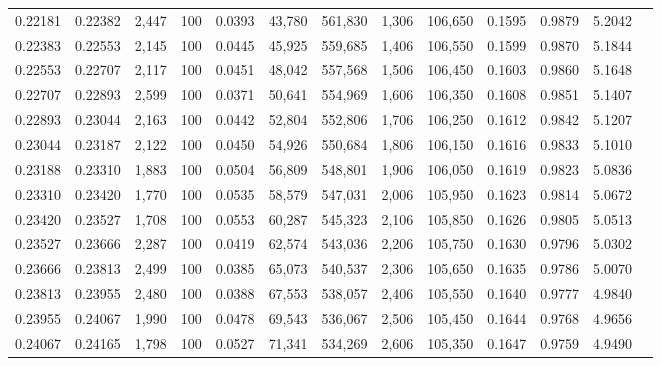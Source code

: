 \begin{tabular}{rrrrrrrrrrrrr}
0.22181 & 0.22382 & 2,447 & 100 &                                     0.0393 &  43,780 & 561,830 &   1,306 & 106,650 & 0.1595 & 0.9879 & 5.2042 \\
0.22383 & 0.22553 & 2,145 & 100 &                                     0.0445 &  45,925 & 559,685 &   1,406 & 106,550 & 0.1599 & 0.9870 & 5.1844 \\
0.22553 & 0.22707 & 2,117 & 100 &                                     0.0451 &  48,042 & 557,568 &   1,506 & 106,450 & 0.1603 & 0.9860 & 5.1648 \\
0.22707 & 0.22893 & 2,599 & 100 &                                     0.0371 &  50,641 & 554,969 &   1,606 & 106,350 & 0.1608 & 0.9851 & 5.1407 \\
0.22893 & 0.23044 & 2,163 & 100 &                                     0.0442 &  52,804 & 552,806 &   1,706 & 106,250 & 0.1612 & 0.9842 & 5.1207 \\
0.23044 & 0.23187 & 2,122 & 100 &                                     0.0450 &  54,926 & 550,684 &   1,806 & 106,150 & 0.1616 & 0.9833 & 5.1010 \\
0.23188 & 0.23310 & 1,883 & 100 &                                     0.0504 &  56,809 & 548,801 &   1,906 & 106,050 & 0.1619 & 0.9823 & 5.0836 \\
0.23310 & 0.23420 & 1,770 & 100 &                                     0.0535 &  58,579 & 547,031 &   2,006 & 105,950 & 0.1623 & 0.9814 & 5.0672 \\
0.23420 & 0.23527 & 1,708 & 100 &                                     0.0553 &  60,287 & 545,323 &   2,106 & 105,850 & 0.1626 & 0.9805 & 5.0513 \\
0.23527 & 0.23666 & 2,287 & 100 &                                     0.0419 &  62,574 & 543,036 &   2,206 & 105,750 & 0.1630 & 0.9796 & 5.0302 \\
0.23666 & 0.23813 & 2,499 & 100 &                                     0.0385 &  65,073 & 540,537 &   2,306 & 105,650 & 0.1635 & 0.9786 & 5.0070 \\
0.23813 & 0.23955 & 2,480 & 100 &                                     0.0388 &  67,553 & 538,057 &   2,406 & 105,550 & 0.1640 & 0.9777 & 4.9840 \\
0.23955 & 0.24067 & 1,990 & 100 &                                     0.0478 &  69,543 & 536,067 &   2,506 & 105,450 & 0.1644 & 0.9768 & 4.9656 \\
0.24067 & 0.24165 & 1,798 & 100 &                                     0.0527 &  71,341 & 534,269 &   2,606 & 105,350 & 0.1647 & 0.9759 & 4.9490 \\

\end{tabular}
